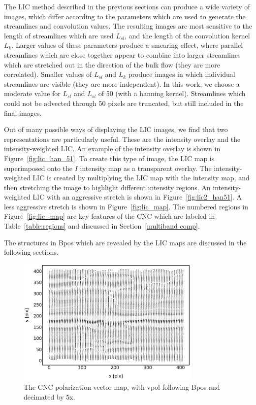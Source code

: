 The LIC method described in the previous sections can produce a wide variety of images, which differ according to the parameters which are used to generate the streamlines and convolution values. The resulting images are most sensitive to the length of streamlines which are used $L_{sl}$, and the length of the convolution kernel $L_{k}$. Larger values of these parameters produce a smearing effect, where parallel streamlines which are close together appear to combine into larger streamlines which are stretched out in the direction of the bulk flow (they are more correlated). Smaller values of $L_{sl}$ and $L_{k}$ produce images in which individual streamlines are visible (they are more independent). In this work, we choose a moderate value for $L_{sl}$ and $L_{sl}$ of 50 (with a hanning kernel). Streamlines which could not be advected through 50 pixels are truncated, but still included in the final images.

Out of many possible ways of displaying the LIC images, we find that two representations are particularly useful. These are the intensity overlay and the intensity-weighted LIC. An example of the intensity overlay is shown in Figure~\ref{fig:lic_han_51}. To create this type of image, the LIC map is superimposed onto the $I$ intensity map as a transparent overlay. The intensity-weighted LIC is created by multiplying the LIC map with the intensity map, and then stretching the image to highlight different intensity regions. An intensity-weighted LIC with an aggressive stretch is shown in Figure~\ref{fig:lic2_han51}. A less aggressive stretch is shown in Figure~\ref{fig:lic_map}. The numbered regions in Figure~\ref{fig:lic_map} are key features of the CNC which are labeled in Table~\ref{table:regions} and discussed in Section~\ref{multiband comp}.

The structures in \gls{Bpos} which are revealed by the LIC maps are discussed in the following sections.

\begin{figure}[!htbp]
\centering
\includegraphics[width=0.8\textwidth]{figures/carina/vectors_5}
\caption[~The CNC polarization vector map, decimated by 5x.]{The CNC polarization vector map, with \gls{vpol} following \gls{Bpos} and decimated by 5x.}
\label{fig:vectors_5}
\end{figure}

